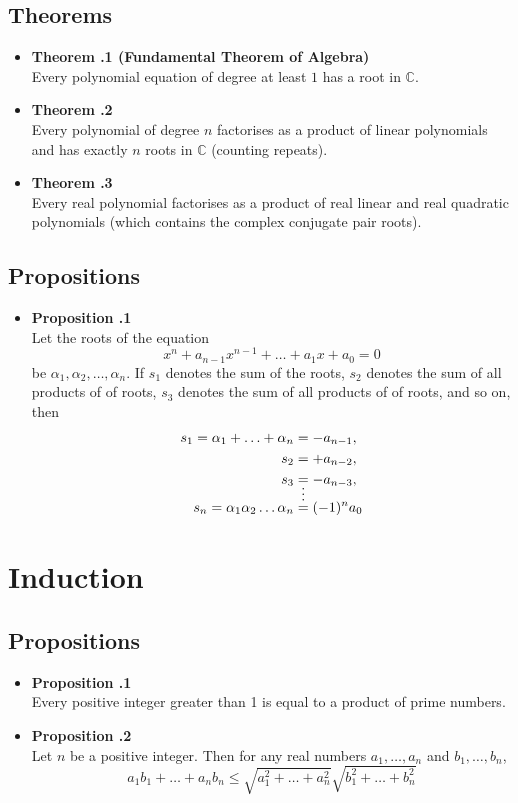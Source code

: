 \documentclass[a4paper,12pt]{article}
\newcommand{\prop}[1]{
    \item \textbf{Proposition \thesection.#1}\\
}
\newcommand{\theo}[1]{
    \item \textbf{Theorem \thesection.#1}\\
}
\let\emph\relax %
\begin{document}
\subsection{Theorems}
\begin{itemize}
    \theo {1 (Fundamental Theorem of Algebra)}
    Every polynomial equation of degree at least $1$ has a root in $\mathbb{C}$.
    
    \theo 2
    Every polynomial of degree $n$ factorises as a product of linear polynomials and has
    exactly $n$ roots in $\mathbb{C}$ (counting repeats).
    
    \theo 3
    Every real polynomial factorises as a product of real linear and real quadratic
    polynomials (which contains the complex conjugate pair roots).
\end{itemize}

\subsection{Propositions}
\begin{itemize}
    \prop 1
    Let the roots of the equation
        $$ x^n + a_{n-1}x^{n-1} + \ldots + a_1x + a_0 = 0 $$
    be $\alpha_1, \alpha_2, \ldots, \alpha_n$. If $s_1$ denotes the sum of the
    roots, $s_2$ denotes the sum of all products of \emph{pairs} of roots, $s_3$ denotes the sum of all products of \emph{triples} of roots, and so on, then
        \begin{align*}
            s_1 = \alpha_1 + \ldots + \alpha_n &= -a_{n-1},\\
            s_2 &= +a_{n-2},\\
            s_3 &= -a_{n-3},\\
            &\shortvdotswithin{=}
            s_n = \alpha_1\alpha_2\ldots\alpha_n &= (-1)^na_0
        \end{align*}
\end{itemize}

\section{Induction}
\subsection{Propositions}
\begin{itemize}
    \prop 1
    Every positive integer greater than 1 is equal to a product of prime numbers.
    
    \prop 2
    Let $n$ be a positive integer. Then for any real numbers $a_1,\ldots,a_n$
    and $b_1,\ldots,b_n$,
        $$ a_1b_1 + \ldots + a_nb_n \le \sqrt{a_1^2 + \ldots + a_n^2} \sqrt{b_1^2 + \ldots + b_n^2} $$
\end{itemize}
\end{document}
